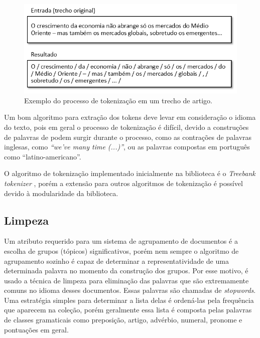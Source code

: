 \documentclass[a4paper,12pt]{article}
\begin{document}
\begin{figure}[H]
    \begin{center}
        \includegraphics[scale=0.6]{tokenizacao.png}
    \end{center}
    \caption{Exemplo do processo de tokenização em um  trecho de artigo.}
    \label{fig:tokenizacao}
\end{figure}

Um bom algoritmo para extração dos tokens deve levar em consideração o idioma do texto, pois em geral o processo de tokenização é difícil, devido a construções de palavras de podem surgir durante o processo, como as contrações de palavras inglesas, como \textit{“we’ve many time (...)”}, ou as palavras compostas em português como “latino-americano”. 

O algoritmo de tokenização implementado inicialmente na biblioteca é o \textit{Treebank tokenizer} \cite{treebank}, porém a extensão para outros algoritmos de tokenização é possível devido à modularidade da biblioteca.

\subsection {Limpeza}
\label {sec:limpeza}

Um atributo requerido para um sistema de agrupamento de documentos é a escolha de grupos (tópicos) significativos, porém nem sempre o algoritmo de agrupamento sozinho é capaz de determinar a representatividade de uma determinada palavra no momento da construção dos grupos. Por esse motivo, é usado a técnica de limpeza para eliminação das palavras que são extremamente comuns no idioma desses documentos. Essas palavras são chamadas de \textit{stopwords}. Uma estratégia simples para determinar a lista delas é ordená-las pela frequência que aparecem na coleção, porém geralmente essa lista é composta pelas palavras de classes gramaticais como preposição, artigo, advérbio, numeral, pronome e pontuações em geral.
\end{document}
